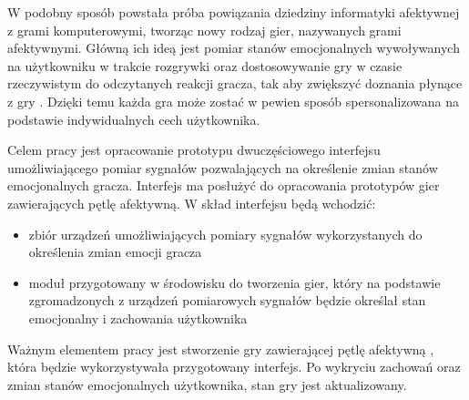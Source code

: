 W podobny sposób powstała próba powiązania dziedziny informatyki afektywnej z grami komputerowymi, tworząc nowy rodzaj gier, nazywanych grami afektywnymi. Główną ich ideą jest pomiar stanów emocjonalnych wywoływanych na użytkowniku w trakcie rozgrywki oraz dostosowywanie gry w czasie rzeczywistym do odczytanych reakcji gracza, tak aby zwiększyć doznania płynące z gry \cite{kotsia_affective_gaming}. Dzięki temu każda gra może zostać w pewien sposób spersonalizowana na podstawie indywidualnych cech użytkownika. 

Celem pracy jest opracowanie prototypu dwuczęściowego interfejsu umożliwiającego pomiar sygnałów pozwalających na określenie zmian stanów emocjonalnych gracza. Interfejs ma posłużyć do opracowania prototypów gier zawierających pętlę afektywną. W skład interfejsu będą wchodzić:
\begin{itemize}
	\item zbiór urządzeń umożliwiających pomiary sygnałów wykorzystanych do określenia zmian emocji gracza
	\item moduł przygotowany w środowisku do tworzenia gier, który na podstawie zgromadzonych z urządzeń pomiarowych sygnałów będzie określał stan emocjonalny i zachowania użytkownika
\end{itemize}
Ważnym elementem pracy jest stworzenie gry zawierającej pętlę afektywną \cite{affective_loop_experiences}, która będzie wykorzystywała przygotowany interfejs. Po wykryciu zachowań oraz zmian stanów emocjonalnych użytkownika, stan gry jest aktualizowany.

